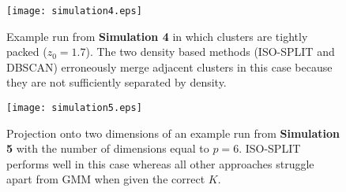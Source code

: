 \documentclass[10pt]{article}
\begin{document}
\begin{figure}
\begin{center}
\texttt{[image: simulation4.eps]}
\end{center}
\caption{
Example run from \textbf{Simulation 4} in which clusters are tightly packed ($z_0=1.7$). The two density based methods (ISO-SPLIT and DBSCAN) erroneously merge adjacent clusters in this case because they are not sufficiently separated by density.
}
\label{fig:simulation4}
\end{figure}

\begin{figure}
\begin{center}
\texttt{[image: simulation5.eps]}
\end{center}
\caption{
Projection onto two dimensions of an example run from \textbf{Simulation 5} with the number of dimensions equal to $p=6$. ISO-SPLIT performs well in this case whereas all other approaches struggle apart from GMM when given the correct $K$.
}
\label{fig:simulation5}
\end{figure}

\newcommand{\multicell}[2][c]{%
  \begin{tabular}[#1]{@{}l@{}}#2\end{tabular}}
\end{document}
